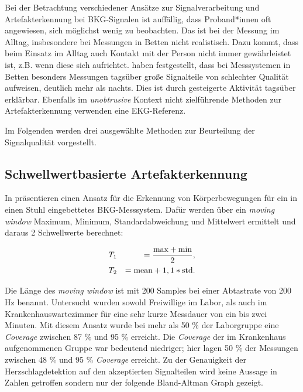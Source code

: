 	Bei der Betrachtung verschiedener Ansätze zur Signalverarbeitung und Artefakterkennung bei \ac{BKG}-Signalen ist auffällig, dass Proband*innen oft angewiesen, sich möglichst wenig zu beobachten. Das ist bei der Messung im Alltag, insbesondere bei Messungen in Betten nicht realistisch. Dazu kommt, dass beim Einsatz im Alltag auch Kontakt mit der Person nicht immer gewährleistet ist, z.B. wenn diese sich aufrichtet. \citeauthor{HoogAntink2020} haben festgestellt, dass bei Messsystemen in Betten besonders Messungen tagsüber große Signalteile von schlechter Qualität aufweisen, deutlich mehr als nachts. Dies ist durch gesteigerte Aktivität tagsüber erklärbar. Ebenfalls im \textit{unobtrusive} Kontext nicht zielführende Methoden zur Artefakterkennung verwenden eine \ac{EKG}-Referenz.
	
	Im Folgenden werden drei ausgewählte Methoden zur Beurteilung der Signalqualität vorgestellt.

	\subsection{Schwellwertbasierte Artefakterkennung}
	
	In  präsentieren \citeauthor{Pino2015} einen Ansatz für die Erkennung von Körperbewegungen für ein in einen Stuhl eingebettetes \ac{BKG}-Messsystem. Dafür werden über ein \textit{moving window} Maximum, Minimum, Standardabweichung und Mittelwert ermittelt und daraus 2 Schwellwerte berechnet:
	
	\begin{eqnarray*}
		&T_1 &= \frac{\text{max} + \text{min}}{2},\notag\\
		&T_2 &= \text{mean} + 1,1 * \text{std}.\notag
	\end{eqnarray*}
	
	Die Länge des \textit{moving window} ist mit 200 Samples bei einer Abtastrate von 200 Hz benannt. Untersucht wurden sowohl Freiwillige im Labor, als auch im Krankenhauswartezimmer für eine sehr kurze Messdauer von ein bis zwei Minuten. Mit diesem Ansatz wurde bei mehr als 50 \% der Laborgruppe eine \textit{Coverage} zwischen 87 \% und 95 \% erreicht. Die \textit{Coverage} der im Krankenhaus aufgenommenen Gruppe war bedeutend niedriger; hier lagen 50 \% der Messungen zwischen 48 \% und 95 \% \textit{Coverage} erreicht. Zu der Genauigkeit der Herzschlagdetektion auf den akzeptierten Signalteilen wird keine Aussage in Zahlen getroffen sondern nur der folgende Bland-Altman Graph gezeigt.
	
